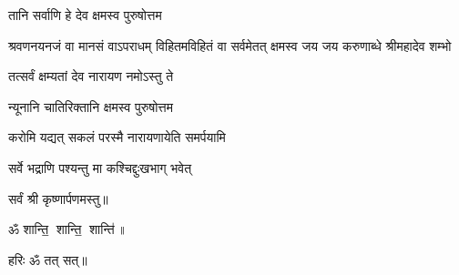 
\clearpage
{}
{तानि सर्वाणि हे देव क्षमस्व पुरुषोत्तम}

{श्रवणनयनजं वा मानसं वाऽपराधम्}
{विहितमविहितं वा सर्वमेतत् क्षमस्व}
{जय जय करुणाब्धे श्रीमहादेव शम्भो}

{तत्सर्वं क्षम्यतां देव नारायण नमोऽस्तु ते}

{न्यूनानि चातिरिक्तानि क्षमस्व पुरुषोत्तम}

{करोमि यद्यत् सकलं परस्मै नारायणायेति समर्पयामि}

{सर्वे भद्राणि पश्यन्तु मा कश्चिद्दुःखभाग् भवेत्}
\centerline{सर्वं श्री कृष्णार्पणमस्तु॥}
\centerline{ॐ शान्ति॒ शान्ति॒ शान्ति॑॥}
\centerline{हरिः ॐ तत् सत्॥}

\closesection